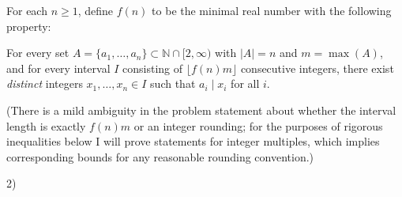 For each $n\ge 1$, define $f(n)$ to be the minimal real number with the following property:

For every set $A=\{a_1,\dots,a_n\}\subset\mathbb{N}\cap[2,\infty)$ with $|A|=n$ and $m=\max(A)$, and for every interval $I$ consisting of $\lfloor f(n)m\rfloor$ consecutive integers, there exist \emph{distinct} integers $x_1,\dots,x_n\in I$ such that $a_i\mid x_i$ for all $i$.

(There is a mild ambiguity in the problem statement about whether the interval length is exactly $f(n)m$ or an integer rounding; for the purposes of rigorous inequalities below I will prove statements for integer multiples, which implies corresponding bounds for any reasonable rounding convention.)

2)
